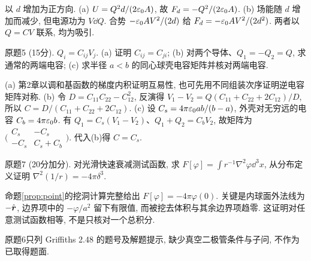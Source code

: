 \begin{solution}
以 $d$ 增加为正方向. (a) $U=Q^2d/(2\varepsilon_0 A)$, 故 $F_d=-Q^2/(2\varepsilon_0 A)$. (b) 场能随 $d$ 增加而减少, 但电源功为 $V\dd Q$. 合势 $-\varepsilon_0 AV^2/(2d)$ 给 $F_d=-\varepsilon_0 AV^2/(2d^2)$. 两者以 $Q=CV$ 联系, 均为吸引.
\end{solution}
\begin{exercise}
原题5 (15分). $Q_i=C_{ij}V_j$. (a) 证明 $C_{ij}=C_{ji}$; (b) 对两个导体、$Q_1=-Q_2=Q$, 求通常的两端电容; (c) 求半径 $a<b$ 的同心球壳电容矩阵并核对两端电容.
\end{exercise}
\begin{solution}
(a) 第2章以调和基函数的梯度内积证明互易性, 也可先用不同组装次序证明逆电容矩阵对称. (b) 令 $D=C_{11}C_{22}-C_{12}^2$, 反演得 $V_1-V_2=Q(C_{11}+C_{22}+2C_{12})/D$, 所以 $C=D/(C_{11}+C_{22}+2C_{12})$. (c) 设 $C_s=4\pi\varepsilon_0 ab/(b-a)$, 外壳对无穷远的电容 $C_b=4\pi\varepsilon_0 b$. 有 $Q_1=C_s(V_1-V_2)$、$Q_1+Q_2=C_bV_2$, 故矩阵为 $\bigl(\begin{smallmatrix}C_s&-C_s\\-C_s&C_s+C_b\end{smallmatrix}\bigr)$. 代入(b)得 $C=C_s$.
\end{solution}
\begin{exercise}
原题7 (20分加分). 对光滑快速衰减测试函数, 求 $F[\varphi]=\int r^{-1}\nabla^2\varphi\dd^3x$, 从分布定义证明 $\nabla^2(1/r)=-4\pi\delta^3$.
\end{exercise}
\begin{solution}
命题\ref{prop:point}的挖洞计算完整给出 $F[\varphi]=-4\pi\varphi(0)$. 关键是内球面外法线为 $-\hat{\boldsymbol{r}}$, 边界项中的 $-\varphi/a^2$ 留下有限值, 而被挖去体积与其余边界项趋零. 这证明对任意测试函数相等, 不是只核对一个总积分.
\end{solution}
原题6只列 Griffiths 2.48 的题号及解题提示, 缺少真空二极管条件与子问, 不作为已取得题面.

